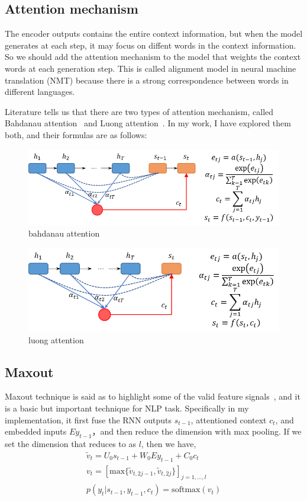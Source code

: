 \documentclass[12pt,a4paper]{article}
\begin{document}
\subsection{Attention mechanism}
The encoder outputs contains the entire context information, but when the model generates at each step, it may focus on diffent words in the context information. So we should add the attention mechanism to the model that weights the context words at each generation step. This is called alignment model in neural machine translation (NMT) because there is a strong correspondence between words in different languages. 

Literature tells us that there are two types of attention mechanism, called Bahdanau attention~\cite{DBLP:journals/corr/BahdanauCB14} and Luong attention~\cite{DBLP:conf/emnlp/LuongPM15}. In my work, I have explored them both, and their formulas are as follows:

\begin{figure}[!htbp]
  \centering
  \includegraphics[width=0.8\linewidth]{./figures/attention_bahdanau.png}
  \caption{bahdanau attention}\label{fig:bahdabau}
\end{figure}

\begin{figure}[!htbp]
  \centering
  \includegraphics[width=0.8\linewidth]{./figures/attention_luong.png}
  \caption{luong attention}\label{fig:luong}
\end{figure}


\subsection{Maxout}
Maxout technique is said as to highlight some of the valid feature signals~\cite{DBLP:conf/icml/GoodfellowWMCB13}, and it is a basic but important technique for NLP task. Specifically in my implementation, it first fuse the RNN outputs $s_{t-1}$, attentioned context $c_t$, and embedded inputs $Ey_{t-1}$，and then reduce the dimension with max pooling. If we set the dimension that reduces to as $l$, then we have,
\begin{gather*}
  \tilde{v}_t =U_0 s_{t-1} + W_0 Ey_{t-1} + C_0 c_t \\
  v_t = [\mathrm{max}\{\tilde{v}_{t,2j-1}, \tilde{v}_{t,2j}\}]_{j=1,...,l} \\
  p(y_t|s_{t-1}, y_{t-1}, c_t) = \mathrm{softmax}(v_t)
\end{gather*}
\end{document}
